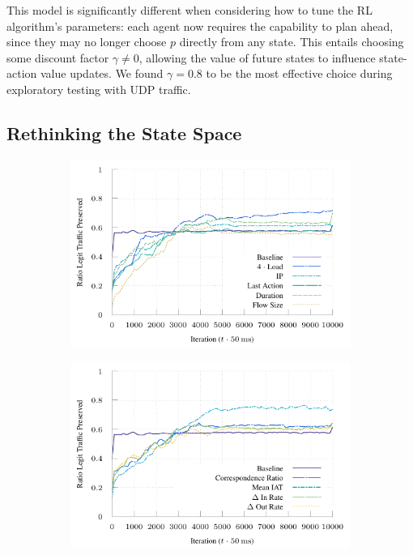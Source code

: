 \documentclass[conference, letterpaper, 10pt, times]{IEEEtran}
\begin{document}
This model is significantly different when considering how to tune the RL algorithm's parameters: each agent now requires the capability to plan ahead, since they may no longer choose $p$ directly from any state.
This entails choosing some discount factor $\gamma \ne 0$, allowing the value of future states to influence state-action value updates.
We found $\gamma = 0.8$ to be the most effective choice during exploratory testing with UDP traffic.

\subsection{Rethinking the State Space}\label{sec:rethinking-the-state-space}

\begin{figure}
	\centering
	\begin{subfigure}{0.32\linewidth}
		\includegraphics[width=\linewidth]{../plots/ftprep-good}
	\end{subfigure}
	\begin{subfigure}{0.32\linewidth}
		\includegraphics[width=\linewidth]{../plots/ftprep-good-2}

\end{subfigure}
\end{figure}
\end{document}
